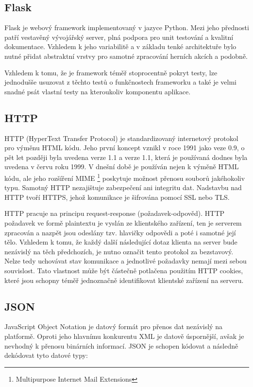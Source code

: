 \documentclass[10pt,titlepage,a4paper]{extarticle}
\begin{document}
\subsection{Flask}

Flask je webový framework implementovaný v jazyce Python. Mezi jeho přednosti patří vestavěný vývojářský server, plná podpora pro unit testování a kvalitní dokumentace. Vzhledem k jeho variabilitě a v základu tenké architektuře bylo nutné přidat abstraktní vrstvy pro samotné zpracování herních akcích a podobně.

Vzhledem k tomu, že je framework téměř stoprocentně pokryt testy, lze jednodušše usuzovat z těchto testů o funkčnostech frameworku a také je velmi snadné psát vlastní testy na kteroukoliv komponentu aplikace.
\subsection{HTTP}

HTTP (HyperText Transfer Protocol) je standardizovaný internetový protokol pro výměnu HTML kódu. Jeho první koncept vznikl v roce 1991 jako veze 0.9, o pět let později byla uvedena verze 1.1 a verze 1.1, která je používaná dodnes byla uvedena v červu roku 1999. V dnešní době je používán nejen k výměně HTML kódu, ale jeho rozšíření MIME \footnote{Multipurpose Internet Mail Extensions} poskytuje možnost přenosu souborů jakéhokoliv typu. Samotný HTTP nezajištuje zabezpečení ani integritu dat. Nadstavbu nad HTTP tvoří HTTPS, jehož komunikace je šifrována pomocí SSL nebo TLS.

HTTP pracuje na principu request-response (požadavek-odpověd). HTTP požadavek ve formě plaintextu je vyslán ze klientského zařízení, ten je serverem zpracován a nazpět jsou odeslány tzv. hlavičky odpovědi a poté i samotné její tělo. Vzhledem k tomu, že každý další následující dotaz klienta na server bude nezávislý na těch předchozích, je nutno označit tento protokol za bezstavový. Nelze tedy uchovávat stav komunikace a jednotlivé požadavky nemají mezi sebou souvislost. Tato vlastnost může být částečně potlačena použitím HTTP cookies, které jsou schopny téměř jednoznačně identifikovat klientské zařízení na serveru.

\subsection{JSON}

JavaScript Object Notation je datový formát pro přenos dat nezávislý na platformě. Oproti jeho hlavnímu konkurentu XML je datově úspornější, avšak je nevhodný k přenosu binárních informací. JSON je schopen kódovat a následně dekódovat tyto datové typy:
\end{document}
